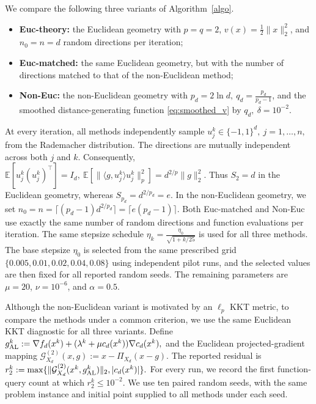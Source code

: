 \documentclass[11pt]{article}
\numberwithin{equation}{section}
\begin{document}
We compare the following three variants of Algorithm~\ref{algo}.
\begin{itemize}
    \item \textbf{Euc-theory:} the Euclidean geometry with $p=q=2$,
    $v(x)=\frac{1}{2}\|x\|_2^2$, and $n_0=n=d$ random directions per iteration;

    \item \textbf{Euc-matched:} the same Euclidean geometry, but with the number of directions matched
    to that of the non-Euclidean method;

    \item \textbf{Non-Euc:} the non-Euclidean geometry with \(p_d=2\ln d,\ q_d=\frac{p_d}{p_d-1}\),
    and the smoothed distance-generating function \eqref{eq:smoothed_v} by \(q_d,\ \delta=10^{-2}\).
\end{itemize}

At every iteration, all methods independently sample \( u_j^k\in\{-1,1\}^d,\ j=1,\ldots,n,\)
from the Rademacher distribution. The directions are mutually independent across both $j$ and $k$.
Consequently, \(\mathbb{E}[u_j^k(u_j^k)^\top]=I_d,\ \mathbb{E}
[\|\langle g,u_j^k\rangle u_j^k\|_p^2]=d^{2/p}\|g\|_2^2.\)
Thus $S_2=d$ in the Euclidean geometry, whereas
$S_{p_d}=d^{2/p_d}=e$. In the non-Euclidean geometry, %
we set \(n_0=n
=\lceil(p_d-1)d^{2/p_d}\rceil=\lceil e(p_d-1)\rceil\). Both Euc-matched and Non-Euc  use exactly
the same number of random directions and function evaluations per iteration.
The same stepsize schedule \(\eta_k=\frac{\eta_0}{\sqrt{1+k/25}}\) is used for all three methods. The base stepsize $\eta_0$ is selected from the same prescribed grid \(\{0.005,0.01,0.02,0.04,0.08\}\)
using independent pilot runs, and the selected values are then fixed for all reported random seeds.
The remaining parameters are $\mu=20$, $\nu=10^{-6}$, and $\alpha=0.5$.

Although the non-Euclidean variant is motivated by an $\ell_p$ KKT metric, to compare the methods under a common criterion, we use the same Euclidean KKT diagnostic for all
three variants. Define \(g_{\rm AL}^k:=\nabla f_d(x^k)+(\lambda^k+\mu c_d(x^k))\nabla c_d(x^k),\) and the Euclidean projected-gradient mapping \(\mathcal{G}_{X_d}^{(2)}(x,g):=x-\Pi_{X_d}(x-g).\)
The reported residual is \(r_2^k:=\max\{\|\mathcal{G}_{X_d}^{(2)}(x^k,g_{\rm AL}^k)\|_2,|c_d(x^k)|\}.\)
For every run, we record the first function-query count at which $r_2^k\le 10^{-2}$. We use ten paired random seeds, with the same problem instance and initial
point supplied to all methods under each seed.
\end{document}
